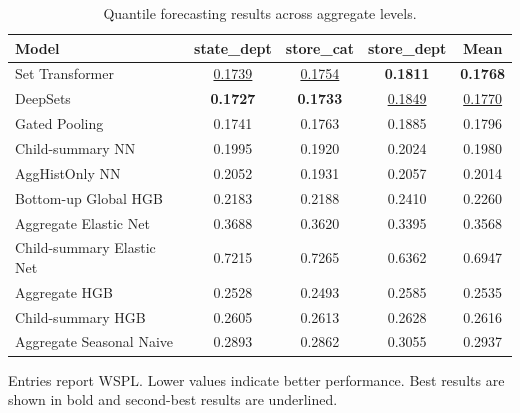 \begin{table}[H]
\centering
\caption{Quantile forecasting results across aggregate levels.}
\label{tab:main_quantile}
\begin{threeparttable}
\begin{tabular}{lcccc}
\toprule
Model & state\_dept & store\_cat & store\_dept & Mean \\
\midrule
Set Transformer & \underline{0.1739} & \underline{0.1754} & \textbf{0.1811} & \textbf{0.1768} \\
DeepSets & \textbf{0.1727} & \textbf{0.1733} & \underline{0.1849} & \underline{0.1770} \\
Gated Pooling & 0.1741 & 0.1763 & 0.1885 & 0.1796 \\
Child-summary NN & 0.1995 & 0.1920 & 0.2024 & 0.1980 \\
AggHistOnly NN & 0.2052 & 0.1931 & 0.2057 & 0.2014 \\
Bottom-up Global HGB & 0.2183 & 0.2188 & 0.2410 & 0.2260 \\
Aggregate Elastic Net & 0.3688 & 0.3620 & 0.3395 & 0.3568 \\
Child-summary Elastic Net & 0.7215 & 0.7265 & 0.6362 & 0.6947 \\
Aggregate HGB & 0.2528 & 0.2493 & 0.2585 & 0.2535 \\
Child-summary HGB & 0.2605 & 0.2613 & 0.2628 & 0.2616 \\
Aggregate Seasonal Naive & 0.2893 & 0.2862 & 0.3055 & 0.2937 \\
\bottomrule
\end{tabular}
\begin{tablenotes}
\footnotesize \item Entries report WSPL. Lower values indicate better performance. Best results are shown in bold and second-best results are underlined.
\end{tablenotes}
\end{threeparttable}
\end{table}
